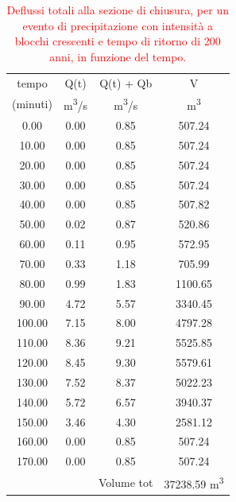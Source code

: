 \begin{table}[H] \centering
    \caption{\textcolor{red}{Deflussi totali alla sezione di chiusura, per un evento di precipitazione con intensità a blocchi crescenti e tempo di ritorno di 200 anni, in funzione del tempo.}}
        \begin{tabular}{cccc}
        \toprule
        tempo    & Q(t)   & Q(t) + Qb  & V        \\
        (minuti) & \unit{m^3/s}& \unit{m^3/s} & \unit{m^3}  \\
        \midrule
        0.00     & 0.00   & 0.85       & 507.24   \\
        10.00    & 0.00   & 0.85       & 507.24   \\
        20.00    & 0.00   & 0.85       & 507.24   \\
        30.00    & 0.00   & 0.85       & 507.24   \\
        40.00    & 0.00   & 0.85       & 507.82   \\
        50.00    & 0.02   & 0.87       & 520.86   \\
        60.00    & 0.11   & 0.95       & 572.95   \\
        70.00    & 0.33   & 1.18       & 705.99   \\
        80.00    & 0.99   & 1.83       & 1100.65  \\
        90.00    & 4.72   & 5.57       & 3340.45  \\
        100.00   & 7.15   & 8.00       & 4797.28  \\
        110.00   & 8.36   & 9.21       & 5525.85  \\
        120.00   & 8.45   & 9.30       & 5579.61  \\
        130.00   & 7.52   & 8.37       & 5022.23  \\
        140.00   & 5.72   & 6.57       & 3940.37  \\
        150.00   & 3.46   & 4.30       & 2581.12  \\
        160.00   & 0.00   & 0.85       & 507.24   \\
        170.00   & 0.00   & 0.85       & 507.24   \\
                 &        & Volume tot & 37238.59 \unit{m^3}\\
        \bottomrule
        \end{tabular}
        \end{table}

